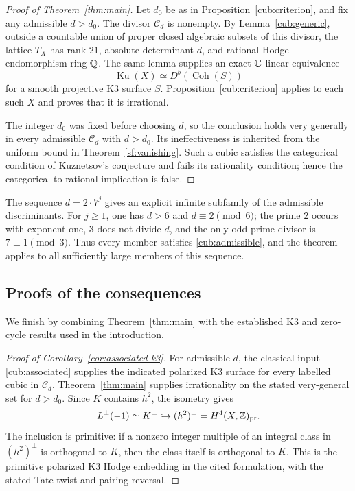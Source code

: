 \begin{proof}[Proof of Theorem~\ref{thm:main}]
Let $d_0$ be as in Proposition~\ref{cub:criterion}, and fix any admissible
$d>d_0$.  The divisor $\mathcal C_d$ is nonempty.  By
Lemma~\ref{cub:generic}, outside a countable union of proper closed
algebraic subsets of this divisor, the lattice $T_X$ has rank $21$,
absolute determinant $d$, and rational Hodge endomorphism ring $\mathbb Q$.
The same lemma supplies an exact $\mathbb C$-linear equivalence
\[
 \operatorname{Ku}(X)\simeq D^b(\operatorname{Coh}(S))
\]
for a smooth projective K3 surface $S$.  Proposition~\ref{cub:criterion}
applies to each such $X$ and proves that it is irrational.

The integer $d_0$ was fixed before choosing $d$, so the conclusion holds
very generally in every admissible $\mathcal C_d$ with $d>d_0$. Its
ineffectiveness is inherited from the uniform bound in
Theorem~\ref{sf:vanishing}. Such a cubic satisfies the categorical
condition of Kuznetsov's conjecture and fails its rationality condition;
hence the categorical-to-rational implication is false.
\end{proof}

The sequence $d=2\cdot7^j$ gives an explicit infinite subfamily of the
admissible discriminants. For $j\geq1$, one has $d>6$ and
$d\equiv2\pmod6$; the prime $2$ occurs with exponent one, $3$ does not
divide $d$, and the only odd prime divisor is $7\equiv1\pmod3$.
Thus every member satisfies \eqref{cub:admissible}, and the theorem
applies to all sufficiently large members of this sequence.

\subsection{Proofs of the consequences}\label{cub:consequences}

We finish by combining Theorem~\ref{thm:main} with the established K3
and zero-cycle results used in the introduction.

\begin{proof}[Proof of Corollary~\ref{cor:associated-k3}]
For admissible \(d\), the classical input \eqref{cub:associated} supplies
the indicated polarized K3 surface for every labelled cubic in
\(\mathcal C_d\). Theorem~\ref{thm:main} supplies irrationality on the
stated very-general set for \(d>d_0\). Since \(K\) contains \(h^2\), the
isometry gives
\[
 L^\perp(-1)\simeq K^\perp\hookrightarrow
 (h^2)^\perp=H^4(X,\mathbb Z)_{\mathrm{pr}}.
\]
The inclusion is primitive: if a nonzero integer multiple of an integral
class in \((h^2)^\perp\) is orthogonal to \(K\), then the class itself is
orthogonal to \(K\). This is the primitive polarized K3 Hodge embedding
in the cited formulation, with the stated Tate twist and pairing reversal.
\end{proof}

